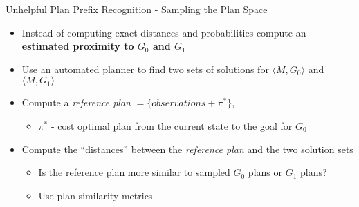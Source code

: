 \begin{frame}{Unhelpful Plan Prefix Recognition - Sampling the Plan Space}
\begin{itemize}
\item Instead of computing exact distances and probabilities compute an \textbf{estimated proximity to $G_0$ and $G_1$}
\item Use an automated planner to find two sets of solutions for $\langle M, G_0\rangle$ and  $\langle M, G_1\rangle$
\item Compute a \textit{reference plan} $= \lbrace observations + \pi^*\rbrace$, 
\begin{itemize}
\item $\pi^*$ - cost optimal plan from the current state to the goal for $G_0$
\end{itemize}
\item Compute the ``distances'' between the \textit{reference plan} and the two solution sets


\begin{itemize}
\item Is the reference plan more similar to sampled $G_0$ plans or $G_1$ plans?
\item Use plan similarity metrics
\end{itemize}

\end{itemize}

\end{frame}